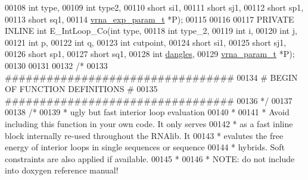\begin{DoxyCode}
00108                                         \textcolor{keywordtype}{int} type,
00109                                         \textcolor{keywordtype}{int} type2,
00110                                         \textcolor{keywordtype}{short} si1,
00111                                         \textcolor{keywordtype}{short} sj1,
00112                                         \textcolor{keywordtype}{short} sp1,
00113                                         \textcolor{keywordtype}{short} sq1,
00114                                         \hyperlink{group__energy__parameters_structvrna__exp__param__s}{vrna\_exp\_param\_t} *P);
00115 
00116 
00117 PRIVATE INLINE \textcolor{keywordtype}{int} E\_IntLoop\_Co(\textcolor{keywordtype}{int} type,
00118                                 \textcolor{keywordtype}{int} type\_2,
00119                                 \textcolor{keywordtype}{int} i,
00120                                 \textcolor{keywordtype}{int} j,
00121                                 \textcolor{keywordtype}{int} p,
00122                                 \textcolor{keywordtype}{int} q,
00123                                 \textcolor{keywordtype}{int} cutpoint,
00124                                 \textcolor{keywordtype}{short} si1,
00125                                 \textcolor{keywordtype}{short} sj1,
00126                                 \textcolor{keywordtype}{short} sp1,
00127                                 \textcolor{keywordtype}{short} sq1,
00128                                 \textcolor{keywordtype}{int} \hyperlink{group__model__details_ga72b511ed1201f7e23ec437e468790d74}{dangles},
00129                                 \hyperlink{group__energy__parameters_structvrna__param__s}{vrna\_param\_t} *P);
00130 
00131 
00132 \textcolor{comment}{/*}
00133 \textcolor{comment}{#################################}
00134 \textcolor{comment}{# BEGIN OF FUNCTION DEFINITIONS #}
00135 \textcolor{comment}{#################################}
00136 \textcolor{comment}{*/}
00137 
00138 \textcolor{comment}{/*}
00139 \textcolor{comment}{ *  ugly but fast interior loop evaluation}
00140 \textcolor{comment}{ *}
00141 \textcolor{comment}{ *  Avoid including this function in your own code. It only serves}
00142 \textcolor{comment}{ *  as a fast inline block internally re-used throughout the RNAlib. It}
00143 \textcolor{comment}{ *  evalutes the free energy of interior loops in single sequences or sequence}
00144 \textcolor{comment}{ *  hybrids. Soft constraints are also applied if available.}
00145 \textcolor{comment}{ *}
00146 \textcolor{comment}{ *  NOTE: do not include into doxygen reference manual!}

\end{DoxyCode}
